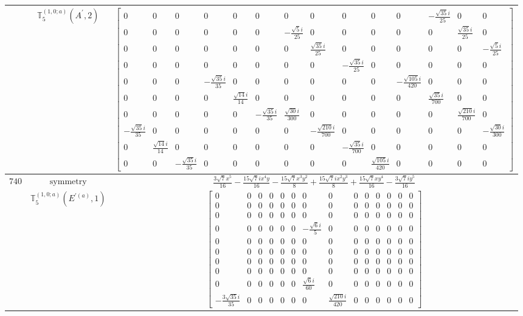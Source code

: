 \documentclass[fleqn,8pt,landscape]{jsarticle}
\begin{document}
\begin{longtable}{ccc}
$  $ & $ \mathbb{T}_{5}^{(1,0;a)}(A^{\prime},2) $ & $ \begin{bmatrix} 0 & 0 & 0 & 0 & 0 & 0 & 0 & 0 & 0 & 0 & 0 & - \frac{\sqrt{35} i}{25} & 0 & 0 \\ 0 & 0 & 0 & 0 & 0 & 0 & - \frac{\sqrt{5} i}{25} & 0 & 0 & 0 & 0 & 0 & \frac{\sqrt{35} i}{25} & 0 \\ 0 & 0 & 0 & 0 & 0 & 0 & 0 & \frac{\sqrt{35} i}{25} & 0 & 0 & 0 & 0 & 0 & - \frac{\sqrt{5} i}{25} \\ 0 & 0 & 0 & 0 & 0 & 0 & 0 & 0 & - \frac{\sqrt{35} i}{25} & 0 & 0 & 0 & 0 & 0 \\ 0 & 0 & 0 & - \frac{\sqrt{35} i}{35} & 0 & 0 & 0 & 0 & 0 & 0 & - \frac{\sqrt{105} i}{420} & 0 & 0 & 0 \\ 0 & 0 & 0 & 0 & \frac{\sqrt{14} i}{14} & 0 & 0 & 0 & 0 & 0 & 0 & \frac{\sqrt{35} i}{700} & 0 & 0 \\ 0 & 0 & 0 & 0 & 0 & - \frac{\sqrt{35} i}{35} & \frac{\sqrt{30} i}{300} & 0 & 0 & 0 & 0 & 0 & \frac{\sqrt{210} i}{700} & 0 \\ - \frac{\sqrt{35} i}{35} & 0 & 0 & 0 & 0 & 0 & 0 & - \frac{\sqrt{210} i}{700} & 0 & 0 & 0 & 0 & 0 & - \frac{\sqrt{30} i}{300} \\ 0 & \frac{\sqrt{14} i}{14} & 0 & 0 & 0 & 0 & 0 & 0 & - \frac{\sqrt{35} i}{700} & 0 & 0 & 0 & 0 & 0 \\ 0 & 0 & - \frac{\sqrt{35} i}{35} & 0 & 0 & 0 & 0 & 0 & 0 & \frac{\sqrt{105} i}{420} & 0 & 0 & 0 & 0 \end{bmatrix} $ \\ \hline
$ 740 $ & $ \text{symmetry} $ & $ \frac{3 \sqrt{7} x^{5}}{16} - \frac{15 \sqrt{7} i x^{4} y}{16} - \frac{15 \sqrt{7} x^{3} y^{2}}{8} + \frac{15 \sqrt{7} i x^{2} y^{3}}{8} + \frac{15 \sqrt{7} x y^{4}}{16} - \frac{3 \sqrt{7} i y^{5}}{16} $ \\
$  $ & $ \mathbb{T}_{5}^{(1,0;a)}(E^{\prime(a)},1) $ & $ \begin{bmatrix} 0 & 0 & 0 & 0 & 0 & 0 & 0 & 0 & 0 & 0 & 0 & 0 & 0 & 0 \\ 0 & 0 & 0 & 0 & 0 & 0 & 0 & 0 & 0 & 0 & 0 & 0 & 0 & 0 \\ 0 & 0 & 0 & 0 & 0 & 0 & 0 & 0 & 0 & 0 & 0 & 0 & 0 & 0 \\ 0 & 0 & 0 & 0 & 0 & 0 & - \frac{\sqrt{6} i}{5} & 0 & 0 & 0 & 0 & 0 & 0 & 0 \\ 0 & 0 & 0 & 0 & 0 & 0 & 0 & 0 & 0 & 0 & 0 & 0 & 0 & 0 \\ 0 & 0 & 0 & 0 & 0 & 0 & 0 & 0 & 0 & 0 & 0 & 0 & 0 & 0 \\ 0 & 0 & 0 & 0 & 0 & 0 & 0 & 0 & 0 & 0 & 0 & 0 & 0 & 0 \\ 0 & 0 & 0 & 0 & 0 & 0 & 0 & 0 & 0 & 0 & 0 & 0 & 0 & 0 \\ 0 & 0 & 0 & 0 & 0 & 0 & \frac{\sqrt{6} i}{60} & 0 & 0 & 0 & 0 & 0 & 0 & 0 \\ - \frac{3 \sqrt{35} i}{35} & 0 & 0 & 0 & 0 & 0 & 0 & \frac{\sqrt{210} i}{420} & 0 & 0 & 0 & 0 & 0 & 0 \end{bmatrix} $ \\ \hline

\end{longtable}
\end{document}
